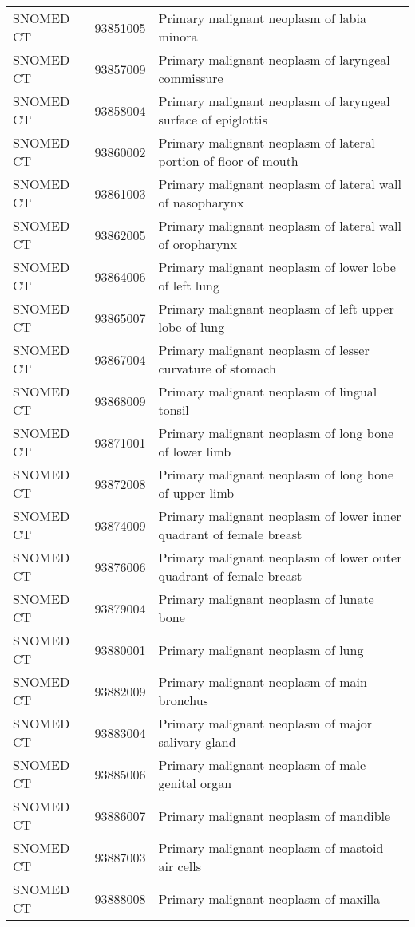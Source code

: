 \begin{longtable}{p{}p{}p{}}
  SNOMED CT & 93851005 & Primary malignant neoplasm of labia minora \\ 
  SNOMED CT & 93857009 & Primary malignant neoplasm of laryngeal commissure \\ 
  SNOMED CT & 93858004 & Primary malignant neoplasm of laryngeal surface of epiglottis \\ 
  SNOMED CT & 93860002 & Primary malignant neoplasm of lateral portion of floor of mouth \\ 
  SNOMED CT & 93861003 & Primary malignant neoplasm of lateral wall of nasopharynx \\ 
  SNOMED CT & 93862005 & Primary malignant neoplasm of lateral wall of oropharynx \\ 
  SNOMED CT & 93864006 & Primary malignant neoplasm of lower lobe of left lung \\ 
  SNOMED CT & 93865007 & Primary malignant neoplasm of left upper lobe of lung \\ 
  SNOMED CT & 93867004 & Primary malignant neoplasm of lesser curvature of stomach \\ 
  SNOMED CT & 93868009 & Primary malignant neoplasm of lingual tonsil \\ 
  SNOMED CT & 93871001 & Primary malignant neoplasm of long bone of lower limb \\ 
  SNOMED CT & 93872008 & Primary malignant neoplasm of long bone of upper limb \\ 
  SNOMED CT & 93874009 & Primary malignant neoplasm of lower inner quadrant of female breast \\ 
  SNOMED CT & 93876006 & Primary malignant neoplasm of lower outer quadrant of female breast \\ 
  SNOMED CT & 93879004 & Primary malignant neoplasm of lunate bone \\ 
  SNOMED CT & 93880001 & Primary malignant neoplasm of lung \\ 
  SNOMED CT & 93882009 & Primary malignant neoplasm of main bronchus \\ 
  SNOMED CT & 93883004 & Primary malignant neoplasm of major salivary gland \\ 
  SNOMED CT & 93885006 & Primary malignant neoplasm of male genital organ \\ 
  SNOMED CT & 93886007 & Primary malignant neoplasm of mandible \\ 
  SNOMED CT & 93887003 & Primary malignant neoplasm of mastoid air cells \\ 
  SNOMED CT & 93888008 & Primary malignant neoplasm of maxilla \\ 

\end{longtable}
